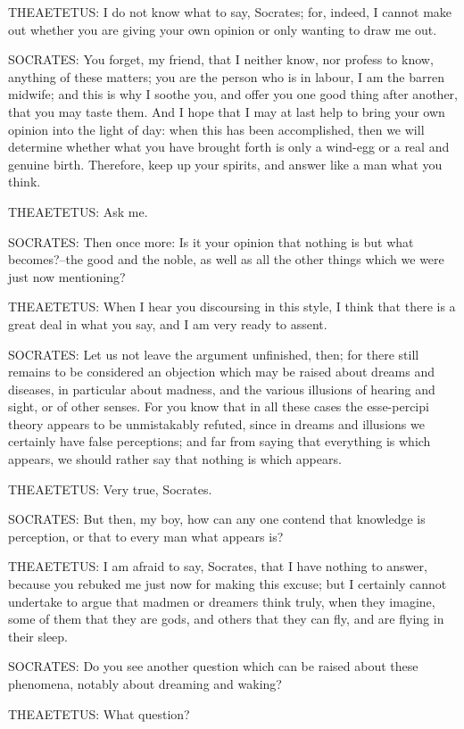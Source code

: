 THEAETETUS: I do not know what to say, Socrates; for, indeed, I cannot
make out whether you are giving your own opinion or only wanting to draw
me out.

SOCRATES: You forget, my friend, that I neither know, nor profess to
know, anything of these matters; you are the person who is in labour, I
am the barren midwife; and this is why I soothe you, and offer you one
good thing after another, that you may taste them. And I hope that I may
at last help to bring your own opinion into the light of day: when this
has been accomplished, then we will determine whether what you have
brought forth is only a wind-egg or a real and genuine birth. Therefore,
keep up your spirits, and answer like a man what you think.

THEAETETUS: Ask me.

SOCRATES: Then once more: Is it your opinion that nothing is but what
becomes?--the good and the noble, as well as all the other things which
we were just now mentioning?

THEAETETUS: When I hear you discoursing in this style, I think that
there is a great deal in what you say, and I am very ready to assent.

SOCRATES: Let us not leave the argument unfinished, then; for there
still remains to be considered an objection which may be raised about
dreams and diseases, in particular about madness, and the various
illusions of hearing and sight, or of other senses. For you know that
in all these cases the esse-percipi theory appears to be unmistakably
refuted, since in dreams and illusions we certainly have false
perceptions; and far from saying that everything is which appears, we
should rather say that nothing is which appears.

THEAETETUS: Very true, Socrates.

SOCRATES: But then, my boy, how can any one contend that knowledge is
perception, or that to every man what appears is?

THEAETETUS: I am afraid to say, Socrates, that I have nothing to answer,
because you rebuked me just now for making this excuse; but I certainly
cannot undertake to argue that madmen or dreamers think truly, when they
imagine, some of them that they are gods, and others that they can fly,
and are flying in their sleep.

SOCRATES: Do you see another question which can be raised about these
phenomena, notably about dreaming and waking?

THEAETETUS: What question?


